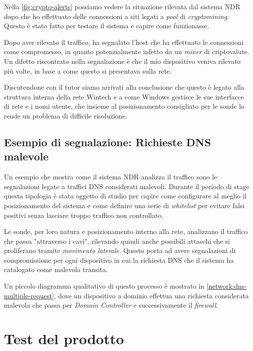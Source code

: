 Nella \autoref{fig:crypto-alerts} possiamo vedere la situazione rilevata dal sistema NDR dopo che ho effettuato delle connessioni a siti legati a \emph{pool} di \emph{cryptomining}. Questo è stato fatto per testare il sistema e capire come funzionasse.

Dopo aver rilevato il traffico, ha segnalato l'host che ha effettuato le connessioni come compromesso, in quanto potenzialmente infetto da un \emph{miner} di criptovalute. Un difetto riscontrato nella segnalazione è che il mio dispositivo veniva rilevato più volte, in base a come questo si presentava sulla rete.

Discutendone con il tutor siamo arrivati alla conclusione che questo è legato alla struttura interna della rete Wintech e a come Windows gestisce le sue interfacce di rete e i nomi utente, che insieme al posizionamento consigliato per le sonde lo rende un problema di difficile risoluzione.

\subsection{Esempio di segnalazione: Richieste DNS malevole}

Un esempio che mostra come il sistema NDR analizza il traffico sono le segnalazioni legate a traffici DNS considerati malevoli. Durante il periodo di stage questa tipologia è stata oggetto di studio per capire come configurare al meglio il posizionamento del sistema e come definire una serie di \emph{whitelist} per evitare falsi positivi senza lasciare troppo traffico non controllato.

Le sonde, per loro natura e posizionamento interno alla rete, analizzano il traffico che passa "attraverso i cavi", rilevando quindi anche possibili attacchi che si proliferano tramite \emph{movimento laterale}. Questo porta ad avere segnalazioni di compromissione per ogni dispositivo in cui la richiesta DNS che il sistema ha catalogato come malevola transita.

Un piccolo diagramma qualitativo di questo processo è mostrato in \autoref{network:dns-multiple-request}, dove un dispositivo a dominio effettua una richiesta considerata malevola che passa per \emph{Domain Controller} e successivamente il \emph{firewall}.

\section{Test del prodotto}

